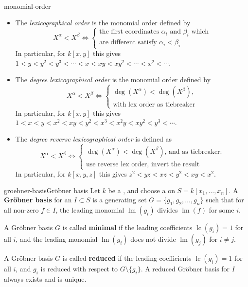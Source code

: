 \begin{example}{monomial-order}
    \begin{itemize}
        \item The \textit{lexicographical order} is the monomial order defined by
        \[ X^\alpha < X^\beta \iff \left\{ \begin{array}{l} \text{the first coordinates $\alpha_i$ and $\beta_i$ which} \\ \text{are different satisfy $\alpha_i < \beta_i$} \end{array} \right. \]
        In particular, for $k[x, y]$ this gives $1 < y < y^2 < y^3 < \cdots < x < xy < xy^2 < \cdots < x^2 < \cdots$.
        \item The \textit{degree lexicographical order} is the monomial order defined by
        \[ X^\alpha < X^\beta \iff \left\{ \begin{array}{l} \text{$\deg(X^\alpha) < \deg(X^\beta)$,} \\ \text{with lex order as tiebreaker} \end{array} \right. \]
        In particular, for $k[x, y]$ this gives $1 < x < y < x^2 < xy < y^2 < x^3 < x^2 y < x y^2 < y^3 < \cdots$.
        \item The \textit{degree reverse lexicographical order} is defined as
        \[ X^\alpha < X^\beta \iff \left\{ \begin{array}{l} \text{$\deg(X^\alpha) < \deg(X^\beta)$, and as tiebreaker:} \\ \text{use reverse lex order, invert the result} \end{array} \right. \]
        In particular, for $k[x, y, z]$ this gives $z^2 < yz < xz < y^2 < xy < x^2$.
    \end{itemize}
\end{example}

\begin{topic}{groebner-basis}{Gröbner basis}
    Let $k$ be a , and choose a  on $S = k[x_1, \ldots, x_n]$. A \textbf{Gröbner basis} for an  $I \subset S$ is a generating set $G = \{ g_1, g_2, \ldots, g_n \}$ such that for all non-zero $f \in I$, the leading monomial $\operatorname{lm}(g_i)$ divides $\operatorname{lm}(f)$ for some $i$.
    
    A Gröbner basis $G$ is called \textbf{minimal} if the leading coefficients $\operatorname{lc}(g_i) = 1$ for all $i$, and the leading monomial $\operatorname{lm}(g_i)$ does not divide $\operatorname{lm}(g_j)$ for $i \ne j$.
    
    A Gröbner basis $G$ is called \textbf{reduced} if the leading coefficients $\operatorname{lc}(g_i) = 1$ for all $i$, and $g_i$ is reduced with respect to $G \setminus \{ g_i \}$. A reduced Gröbner basis for $I$ always exists and is unique.
\end{topic}


